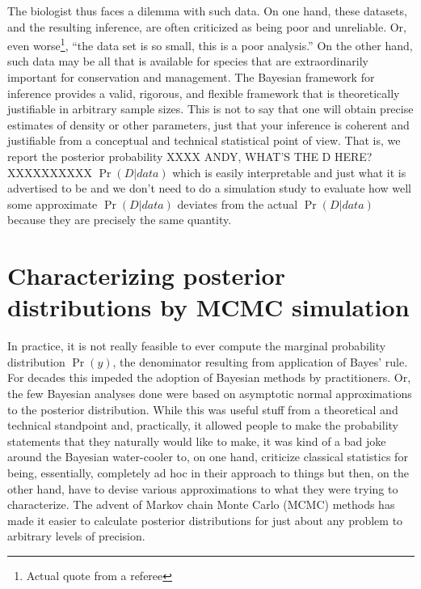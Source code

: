 The biologist thus faces a dilemma with such data. On one hand, these
datasets, and the resulting inference, are often criticized as being
poor and unreliable. Or, even worse\footnote{Actual quote from a
  referee}, ``the data set is so small, this is a poor analysis.''  On
the other hand, such data may be all that is available for species
that are extraordinarily important for conservation and management.
The Bayesian framework for inference provides a valid, rigorous, and
flexible framework that is theoretically justifiable in arbitrary
sample sizes. This is not to say that one will obtain precise
estimates of density or other parameters, just that your inference is
coherent and justifiable from a conceptual and technical statistical
point of view. That is, we report the posterior probability
XXXX ANDY, WHAT'S THE D HERE? XXXXXXXXXX
$\Pr(D|data)$ which is easily interpretable and just what it is
advertised to be and we don't need to do a simulation study to
evaluate how well some approximate $\Pr(D|data)$ deviates from the
actual $\Pr(D|data)$ because they are precisely the same quantity.

\section{Characterizing posterior distributions by MCMC simulation}

In practice, it is not really feasible to ever compute the marginal
probability distribution $\Pr(y)$, the denominator resulting from
application of Bayes' rule. For decades this impeded the adoption of
Bayesian methods by practitioners. Or, the few Bayesian analyses done
were based on asymptotic normal approximations to the posterior
distribution. While this was useful stuff from a theoretical and
technical standpoint and, practically, it allowed people to make the
probability statements that they naturally would like to make, it was
kind of a bad joke around the Bayesian water-cooler to, on one hand,
criticize classical statistics for being, essentially, completely ad
hoc in their approach to things but then, on the other hand, have to
devise various approximations to what they were trying to
characterize. The advent of Markov chain Monte Carlo (MCMC) methods
has made it easier to calculate posterior distributions for just about
any problem to arbitrary levels of precision.


